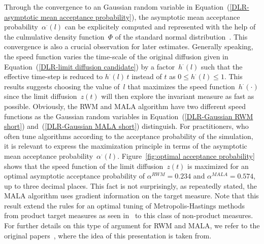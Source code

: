 Through the convergence to an Gaussian random variable in Equation~(\ref{DLR-asymptotic mean acceptance probability}), the asymptotic mean acceptance probability~$\alpha^{\cdot}(l)$ can be explicitely computed and represented with the help of the culmulative density function~$\Phi$ of the standard normal distribution~\autocite[Lemma B2]{Beskos2009-2}. This convergence is also a crucial observation for later estimates. Generally speaking, the speed function varies the time-scale of the original diffusion given in Equation~(\ref{DLR-limit diffusion candidate}) by a factor~$h^{\cdot}(l)$ such that the effective time-step is reduced to $h^{\cdot}(l)\,t$ instead of $t$ as $ 0 \leq h^{\cdot}(l) \leq 1$. This results suggests choosing the value of~$l$ that maximizes the speed function~$h^{\cdot}(\cdot)$ since the limit diffusion~$z(t)$ will then explore the invariant measure as fast as possible. Obviously, the RWM and MALA algorithm have two different speed functions as the Gaussian random variables in Equation~(\ref{DLR-Gaussian RWM short}) and~(\ref{DLR-Gaussian MALA short}) distinguish. For practitioners, who often tune algorithms according to the acceptance probability of the simulation, it is relevant to express the maximization principle in terms of the asymptotic mean acceptance probability~$\alpha^{\cdot}(l)$. Figure~\ref{fig:optimal acceptance probability} shows that the speed function of the limit diffusion~$z(t)$ is maximized for an optimal asymptotic acceptance probability of $\alpha^{RWM}=0.234$ and $\alpha^{MALA}=0.574$, up to three decimal places. This fact is not surprisingly, as repeatedly stated, the MALA algorithm uses gradient information on the target measure. Note that this result extend the rules for an optimal tuning of Metropolis-Hastings methods from product target measures as seen in~\autocite{Bedard2007, Roberts1997, Roberts1998} to this class of non-product measures. For further details on this type of argument for RWM and MALA, we refer to the original papers~\autocite[Section 2.3, Section 2.6]{Mattingly2010, Pillai2012}, where the idea of this presentation is taken from.

